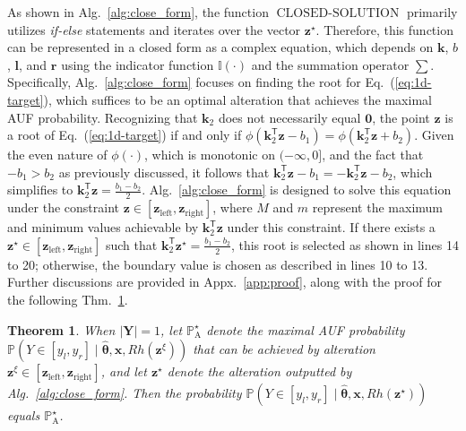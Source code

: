 \documentclass{article}
\theoremstyle{plain}
\newtheorem{theorem}{Theorem}[section]
\theoremstyle{definition}
\def \x {\mathbf{x}}
\def \Y{\mathbf{Y}}
\def \Eq {Eq.}
\def \x {\mathbf{x}}
\def \Y {\mathbf{Y}}
\def \k {\mathbf{k}}
\def \z {\mathbf{z}}
\begin{document}
As shown in Alg.~\ref{alg:close_form}, the function \(\operatorname*{CLOSED-SOLUTION}\) primarily utilizes \emph{if-else} statements and iterates over the vector \(\z^\star\). Therefore, this function can be represented in a closed form as a complex equation, which depends on \(\k\), \(b\), \(\bm{l}\), and \(\bm{r}\) using the indicator function \(\mathbb{I}(\cdot)\) and the summation operator \(\sum\). 
Specifically, Alg.~\ref{alg:close_form} focuses on finding the root for \Eq~(\ref{eq:1d-target}), which suffices to be an optimal alteration that achieves the maximal AUF probability. Recognizing that \(\k_2\) does not necessarily equal \(\bm{0}\), the point \(\z\) is a root of \Eq~(\ref{eq:1d-target}) if and only if \(\phi\left(\k_2^\mathsf{T} \z - b_1\right) = \phi\left(\k_2^\mathsf{T} \z + b_2\right)\). Given the even nature of \(\phi(\cdot)\), which is monotonic on \((- \infty, 0]\), and the fact that \(-b_1 > b_2\) as previously discussed, it follows that \(\k_2^\mathsf{T} \z - b_1 = -\k_2^\mathsf{T} \z - b_2\), which simplifies to \(\k_2^\mathsf{T} \z = \frac{b_1 - b_2}{2}\). Alg.~\ref{alg:close_form} is designed to solve this equation under the constraint \(\z \in [\z_{\operatorname{left}}, \z_{\operatorname{right}}]\), where \(M\) and \(m\) represent the maximum and minimum values achievable by \(\k_2^\mathsf{T} \z\) under this constraint. If there exists a \(\z^\star \in [\z_{\operatorname{left}}, \z_{\operatorname{right}}]\) such that \(\k_2^\mathsf{T} \z^\star = \frac{b_1 - b_2}{2}\), this root is selected as shown in lines 14 to 20; otherwise, the boundary value is chosen as described in lines 10 to 13. Further discussions are provided in Appx.~\ref{app:proof}, along with the proof for the following Thm.~\ref{thm:close}.

\begin{theorem}
  \label{thm:close}
      When \(|\Y|=1\), let \(\mathbb{P}_{\operatorname*{A}}^\star\) denote the maximal AUF probability \(\mathbb{P}(Y \in [y_l, y_r]\mid \hat{\bm{\theta}}, \x, Rh(\z^\xi))\) that can be achieved by alteration \(\z^\xi\in\left[\z_{\operatorname*{left}}, \z_{\operatorname*{right}}\right]\), and let \(\z^\star\) denote the alteration outputted by Alg.~\ref{alg:close_form}. Then the probability \(\mathbb{P}(Y \in [y_l, y_r]\mid \hat{\bm{\theta}}, \x, Rh(\z^\star))\) equals \(\mathbb{P}_{\operatorname*{A}}^\star\).
  \end{theorem}
\vskip -0.05in
\end{document}
